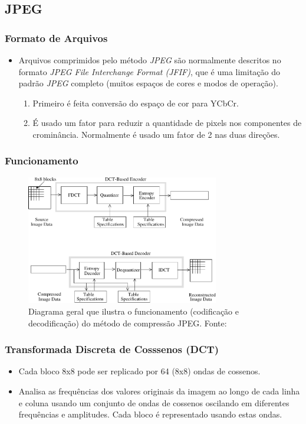\documentclass{beamer}
\begin{document}
\subsection{JPEG}
\begin{frame}
\frametitle{Formato de Arquivos}
\begin{itemize}
\item Arquivos comprimidos pelo método \textit{JPEG} são normalmente descritos no formato \textit{JPEG File Interchange Format (JFIF)}, que é uma limitação do padrão \textit{JPEG} completo (muitos espaços de cores e modos de operação).
\begin{enumerate}
\item Primeiro é feita conversão do espaço de cor para YCbCr.
\item É usado um fator para reduzir a quantidade de pixels nos componentes de crominância. Normalmente é usado um fator de 2 nas duas direções.
\end{enumerate}
\end{itemize} 
\end{frame}
\begin{frame}
\frametitle{Funcionamento}
\begin{figure}
\includegraphics[width=0.75\textwidth]{figs/jpeg.pdf}
\caption{Diagrama geral que ilustra o funcionamento (codificação e decodificação) do método de compressão JPEG. Fonte:~\cite{jpeg}}
\end{figure} 
\end{frame}
\begin{frame}
\frametitle{Transformada Discreta de Cosssenos (DCT)}
\begin{itemize}
\item Cada bloco 8x8 pode ser replicado por 64 (8x8) ondas de cossenos.
\item Analisa as frequências dos valores originais da imagem ao longo de cada linha e coluna usando um conjunto de ondas de cossenos oscilando em diferentes frequências e amplitudes. Cada bloco é representado usando estas ondas.
\end{itemize} 
\end{frame}
\end{document}
